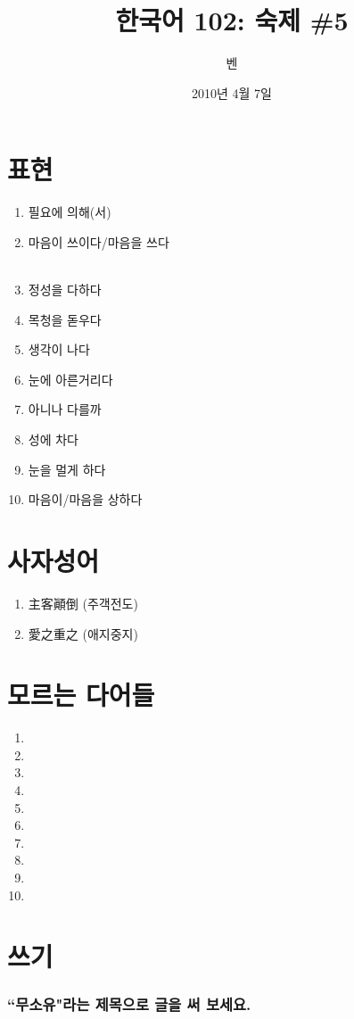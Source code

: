 \documentclass[11pt]{article}
\title{한국어 102: 숙제 \#5}
\author{벤}
\date{2010년 4월 7일}
\begin{document}
\maketitle
\thispagestyle{empty}
\pagestyle{empty}

\section{표현}
\begin{enumerate}
\item 필요에 의해(서) \\
\item 마음이 쓰이다/마음을 쓰다 \\\
\item 정성을 다하다 \\
\item 목청을 돋우다 \\
\item 생각이 나다 \\
\item 눈에 아른거리다 \\
\item 아니나 다를까 \\
\item 성에 차다 \\
\item 눈을 멀게 하다 \\
\item 마음이/마음을 상하다 \\
\end{enumerate}

\section{사자성어}
\begin{enumerate}
\item 主客顚倒 (주객전도) \\
\item 愛之重之 (애지중지) \\
\end{enumerate}

\section{모르는 다어들}
\begin{enumerate}
  \item 
  \item 
  \item 
  \item 
  \item 
  \item 
  \item 
  \item 
  \item 
  \item 
\end{enumerate}
\section{쓰기}
\doublespacing
\subsubsection*{``무소유"라는 제목으로 글을 써 보세요.}
\end{document}
